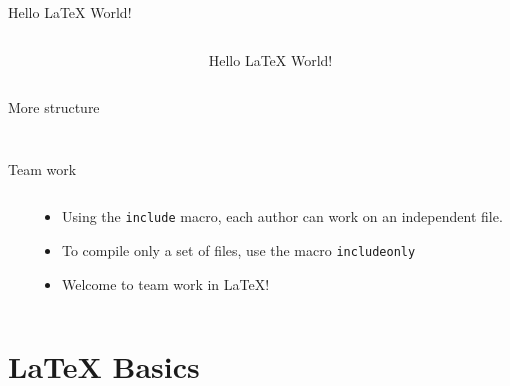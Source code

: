\begin{frame}[fragile]{Hello \LaTeX{} World!}
\begin{columns}
\begin{column}{5cm}
\vspace{-2cm}
%
\end{column}
\begin{column}{5cm}
Hello \LaTeX{} World!
\end{column}
\end{columns}
\end{frame}

\begin{frame}[fragile]{More structure}
\begin{columns}
\begin{column}{5.5cm}
%
\end{column}
\begin{column}{4.5cm}
\vspace{-2cm}
\begin{figure}
\end{figure}
\end{column}
\end{columns}
\end{frame}

\begin{frame}[fragile]{Team work}
\begin{columns}
\begin{column}{5cm}
%
\end{column}
\begin{column}{5cm}
\begin{itemize}
\item Using the \texttt{include} macro, each author can work on an independent file. 
\item To compile only a set of files, use the macro \texttt{includeonly}
\item Welcome to team work in \LaTeX{}!
\end{itemize}
\end{column}
\end{columns}
\end{frame}

\section{\LaTeX{} Basics}


